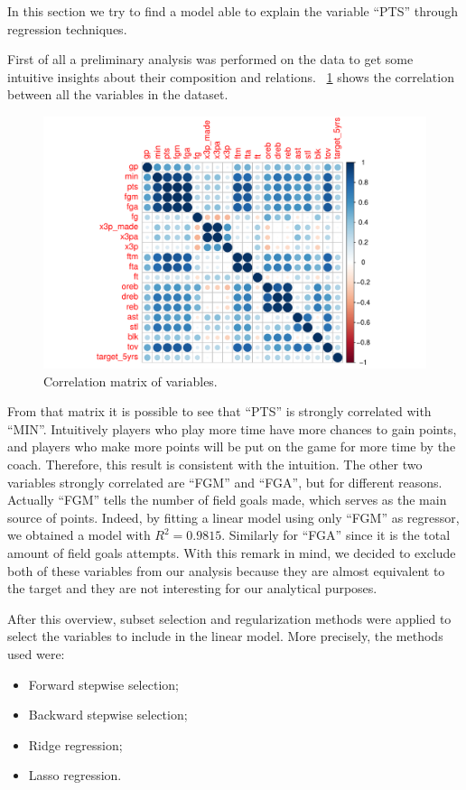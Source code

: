 In this section we try to find a model able to explain the variable ``PTS'' through regression techniques.

First of all a preliminary analysis was performed on the data to get some intuitive insights about their composition and relations.
\Fig~\ref{fig:CorrMatrix} shows the correlation between all the variables in the dataset.

\begin{figure}[h]
	\centering
	\includegraphics[width=0.7\linewidth]{ImageFiles/Regression/CorrMatrix.pdf}
	\caption{Correlation matrix of variables.}
	\label{fig:CorrMatrix}
\end{figure}

From that matrix it is possible to see that ``PTS'' is strongly correlated with ``MIN''. Intuitively players who play more time have more chances to gain points, and players who make more points will be put on the game for more time by the coach. Therefore, this result is consistent with the intuition.
The other two variables strongly correlated are ``FGM'' and ``FGA'', but for different reasons. Actually ``FGM'' tells the number of field goals made, which serves as the main source of points. Indeed, by fitting a linear model using only ``FGM'' as regressor, we obtained a model with $R^2 = 0.9815$. Similarly for ``FGA'' since it is the total amount of field goals attempts. With this remark in mind, we decided to exclude both of these variables from our analysis because they are almost equivalent to the target and they are not interesting for our analytical purposes.

After this overview, subset selection and regularization methods were applied to select the variables to include in the linear model. More precisely, the methods used were:
\begin{itemize}
	\item Forward stepwise selection;
	\item Backward stepwise selection;
	\item Ridge regression;
	\item Lasso regression.
\end{itemize}
